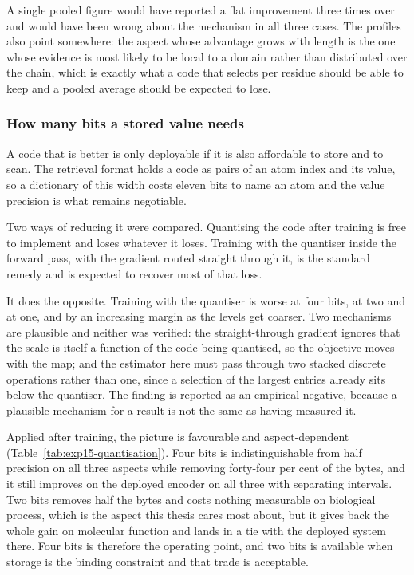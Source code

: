 A single pooled figure would have reported a flat improvement three times over and
would have been wrong about the mechanism in all three cases. The profiles also point
somewhere: the aspect whose advantage grows with length is the one whose evidence is
most likely to be local to a domain rather than distributed over the chain, which is
exactly what a code that selects per residue should be able to keep and a pooled
average should be expected to lose.

\subsubsection{How many bits a stored value needs}
\label{sec:exp15-bits}

A code that is better is only deployable if it is also affordable to store and to
scan. The retrieval format holds a code as pairs of an atom index and its value, so a
dictionary of this width costs eleven bits to name an atom and the value precision is
what remains negotiable.

Two ways of reducing it were compared. Quantising the code after training is free to
implement and loses whatever it loses. Training with the quantiser inside the forward
pass, with the gradient routed straight through it, is the standard remedy and is
expected to recover most of that loss.

It does the opposite. Training with the quantiser is worse at four bits, at two and
at one, and by an increasing margin as the levels get coarser. Two mechanisms are
plausible and neither was verified: the straight-through gradient ignores that the
scale is itself a function of the code being quantised, so the objective moves with
the map; and the estimator here must pass through two stacked discrete operations
rather than one, since a selection of the largest entries already sits below the
quantiser. The finding is reported as an empirical negative, because a plausible
mechanism for a result is not the same as having measured it.

Applied after training, the picture is favourable and aspect-dependent
(Table~\ref{tab:exp15-quantisation}). Four bits is indistinguishable from half
precision on all three aspects while removing forty-four per cent of the bytes, and
it still improves on the deployed encoder on all three with separating intervals. Two
bits removes half the bytes and costs nothing measurable on biological process, which
is the aspect this thesis cares most about, but it gives back the whole gain on
molecular function and lands in a tie with the deployed system there. Four bits is
therefore the operating point, and two bits is available when storage is the binding
constraint and that trade is acceptable.

